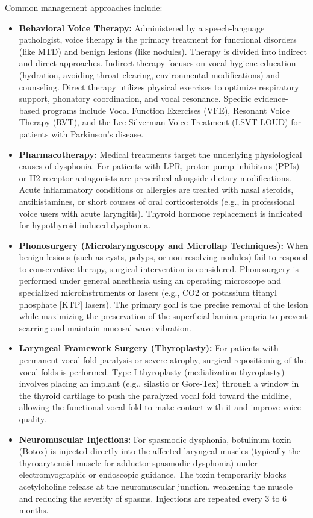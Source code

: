 Common management approaches include:
\begin{itemize}
    \item \textbf{Behavioral Voice Therapy:} Administered by a speech-language pathologist, voice therapy is the primary treatment for functional disorders (like MTD) and benign lesions (like nodules). Therapy is divided into indirect and direct approaches. Indirect therapy focuses on vocal hygiene education (hydration, avoiding throat clearing, environmental modifications) and counseling. Direct therapy utilizes physical exercises to optimize respiratory support, phonatory coordination, and vocal resonance. Specific evidence-based programs include Vocal Function Exercises (VFE), Resonant Voice Therapy (RVT), and the Lee Silverman Voice Treatment (LSVT LOUD) for patients with Parkinson's disease.
    \item \textbf{Pharmacotherapy:} Medical treatments target the underlying physiological causes of dysphonia. For patients with LPR, proton pump inhibitors (PPIs) or H2-receptor antagonists are prescribed alongside dietary modifications. Acute inflammatory conditions or allergies are treated with nasal steroids, antihistamines, or short courses of oral corticosteroids (e.g., in professional voice users with acute laryngitis). Thyroid hormone replacement is indicated for hypothyroid-induced dysphonia.
    \item \textbf{Phonosurgery (Microlaryngoscopy and Microflap Techniques):} When benign lesions (such as cysts, polyps, or non-resolving nodules) fail to respond to conservative therapy, surgical intervention is considered. Phonosurgery is performed under general anesthesia using an operating microscope and specialized microinstruments or lasers (e.g., CO2 or potassium titanyl phosphate [KTP] lasers). The primary goal is the precise removal of the lesion while maximizing the preservation of the superficial lamina propria to prevent scarring and maintain mucosal wave vibration.
    \item \textbf{Laryngeal Framework Surgery (Thyroplasty):} For patients with permanent vocal fold paralysis or severe atrophy, surgical repositioning of the vocal folds is performed. Type I thyroplasty (medialization thyroplasty) involves placing an implant (e.g., silastic or Gore-Tex) through a window in the thyroid cartilage to push the paralyzed vocal fold toward the midline, allowing the functional vocal fold to make contact with it and improve voice quality.
    \item \textbf{Neuromuscular Injections:} For spasmodic dysphonia, botulinum toxin (Botox) is injected directly into the affected laryngeal muscles (typically the thyroarytenoid muscle for adductor spasmodic dysphonia) under electromyographic or endoscopic guidance. The toxin temporarily blocks acetylcholine release at the neuromuscular junction, weakening the muscle and reducing the severity of spasms. Injections are repeated every 3 to 6 months.
\end{itemize}

